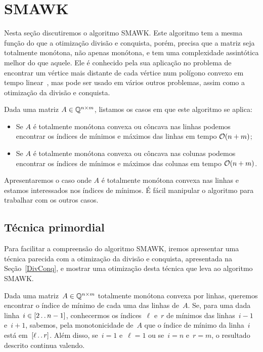 \section{SMAWK}
\label{SMAWK}


Nesta seção discutiremos o algoritmo SMAWK. Este algoritmo tem a mesma função do que a otimização divisão e conquista, porém, precisa que a matriz seja totalmente monótona, não apenas monótona, e tem uma complexidade assintótica melhor do que aquele. Ele é conhecido pela sua aplicação no problema de encontrar um vértice mais distante de cada vértice num polígono convexo em tempo linear~\cite{Aggarwal:1987}, mas pode ser usado em vários outros problemas, assim como a otimização da divisão e conquista.

Dada uma matriz $A \in \mathbb{Q}^{n \times m}$, listamos os casos em que este algoritmo se aplica:
\begin{itemize}
    \item Se $A$ é totalmente monótona convexa ou côncava nas linhas podemos encontrar os índices de mínimos e máximos das linhas em tempo $\mathcal{O}(n + m)$;
    \item Se $A$ é totalmente monótona convexa ou côncava nas colunas podemos encontrar os índices de mínimos e máximos das colunas em tempo $\mathcal{O}(n + m)$.
\end{itemize}

Apresentaremos o caso onde $A$ é totalmente monótona convexa nas linhas e estamos interessados nos índices de mínimos. É fácil manipular o algoritmo para trabalhar com os outros casos.


\subsection{Técnica primordial} \label{SMAWK:primordial}
Para facilitar a compreensão do algoritmo SMAWK, iremos apresentar uma técnica parecida com a otimização da divisão e conquista, apresentada na Seção~\ref{DivConq}, e mostrar uma otimização desta técnica que leva ao algoritmo SMAWK.

Dada uma matriz~$A \in \mathbb{Q}^{n \times m}$ totalmente monótona convexa por linhas, queremos encontrar o índice de mínimo de cada uma das linhas de~$A$. Se, para uma dada linha~${ i \in [2 \,.\,.\, n-1] }$, conhecermos os índices~$\ell$ e~$r$ de mínimos das linhas~${ i-1 }$ e~${ i+1 }$, sabemos, pela monotonicidade de~$A$ que o índice de mínimo da linha~$i$ está em~${ [\ell \,.\,.\, r] }$. Além disso, se~${ i = 1 }$ e~${ \ell = 1 }$ ou se~${ i = n }$ e~${ r = m }$, o resultado descrito continua valendo.

